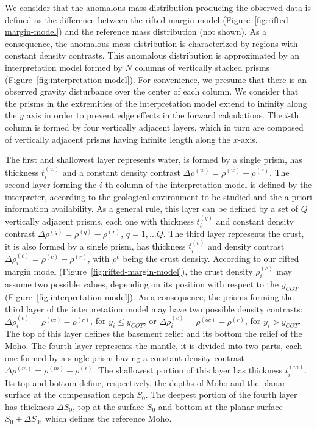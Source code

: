 \documentclass[manuscript]{geophysics}
\begin{document}
We consider that the anomalous mass distribution producing the observed data
is defined as the difference between the rifted margin model 
(Figure~\ref{fig:rifted-margin-model}) and the reference mass distribution (not shown).
As a consequence, the anomalous mass distribution is characterized by regions
with constant density contrasts.
This anomalous distribution is approximated by an interpretation model 
formed by $N$ columns of vertically stacked prisms 
(Figure~\ref{fig:interpretation-model}).
For convenience, we presume that there is an observed gravity disturbance over the
center of each column.
We consider that the prisms in the extremities of the interpretation model extend to
infinity along the $y$ axis in order to prevent edge effects in the forward 
calculations. 
The $i$-th column is formed by four vertically adjacent layers, which in turn are
composed of vertically adjacent prisms having infinite length along the $x$-axis.

The first and shallowest layer represents water, 
is formed by a single prism, has thickness $t^{(w)}_{i}$ and a constant density
contrast $\Delta \rho^{(w)} = \rho^{(w)} - \rho^{(r)}$.
The second layer forming the $i$-th column of the interpretation model is defined by
the interpreter, according to the geological environment to be studied and the a priori
information availability. 
As a general rule, this layer can be defined by a set of $Q$ vertically adjacent
prisms, each one with thickness $t^{(q)}_{i}$ and constant density contrast
$\Delta \rho^{(q)} = \rho^{(q)} - \rho^{(r)}$, $q = 1, \dots Q$.
The third layer represents the crust, it is also formed by a single prism,
has thickness $t^{(c)}_{i}$ and density contrast 
$\Delta \rho^{(c)}_{i} = \rho^{(c)} - \rho^{(r)}$, 
with $\rho^{c}$ being the crust density. 
According to our rifted margin model (Figure~\ref{fig:rifted-margin-model}), the crust
density $\rho^{(c)}_{i}$ may assume two possible values, depending on its position
with respect to the $y_{COT}$ (Figure~\ref{fig:interpretation-model}).
As a consequence, the prisms forming the third layer of the interpretation model may
have two possible density contrasts: $\Delta \rho^{(c)}_{i} = \rho^{(cc)} - \rho^{(r)}$,
for $y_{i} \le y_{COT}$, or $\Delta \rho^{(c)}_{i} = \rho^{(oc)} - \rho^{(r)}$,
for $y_{i} > y_{COT}$. 
The top of this layer defines the basement relief and its bottom the relief of the
Moho. 
The fourth layer represents the mantle, it is divided into two parts, each one formed
by a single prism having a constant density contrast 
$\Delta \rho^{(m)} = \rho^{(m)} - \rho^{(r)}$. The shallowest
portion of this layer has thickness $t^{(m)}_{i}$. Its top and bottom define,
respectively, the depths of Moho and the planar surface at the compensation depth $S_{0}$.
The deepest portion of the fourth layer has thickness $\Delta S_{0}$, top at the
surface $S_{0}$ and bottom at the planar surface 
$S_{0} + \Delta S_{0}$, which defines the reference Moho. 
\end{document}
